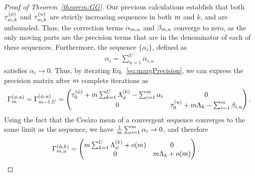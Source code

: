 \begin{proof}[Proof of Theorem~\ref{theorem:GG}]
Our previous calculations establish that both $\tau^{(\phi)}_{m, k}$ and $\tau^{(u)}_{m, k}$ are strictly increasing sequences in both $m$ and $k$, and are unbounded. 
Thus, the correction terms $\alpha_{m, u}$ and $\beta_{m, u}$ converge to zero, as the only moving parts are the precision terms that are in the denominator of each of these sequences. 
Furthermore, the sequence $\{\alpha_i\}$, defined as
\begin{align*}
  \alpha_i = \sum_{u = 1}^U \alpha_{i, u} 
\end{align*}
satisfies $\alpha_i \rightarrow 0$. 
Thus, by iterating Eq.~\ref{eq:margPrecision}, we can express the precision matrix after $m$ complete iterations as
\begin{align*}
  \Gamma^{(\phi, u)}_{m} = \Gamma^{(\phi, u)}_{m-1, U} = \begin{pmatrix}
    \tau^{(\phi)}_{0} + m\sum_{k = 1}^{U}\Lambda^{(k)}_{\phi} - \sum_{i = 1}^m\alpha_{i} & 0 \\
    0 & \tau^{(u)}_{0} + m\Lambda_{k} - \sum_{i = 1}^m \beta_{i, u}
  \end{pmatrix}.
\end{align*}
Using the fact that the Ces\`aro mean of a convergent sequence converges to the same limit as the sequence, we have $\frac{1}{m}\sum_{i = 1}^m \alpha_{i} \rightarrow 0$, and therefore 
\begin{align}
  \Gamma^{(\phi, k)}_{m, u} &= \begin{pmatrix} 
    m\sum_{k = 1}^U \Lambda_{\phi}^{(k)} + o(m) & 0 \\
    0 & m\Lambda_k + o(m)
  \end{pmatrix}. \label{eq:nGamma}
\end{align}


\end{proof}
